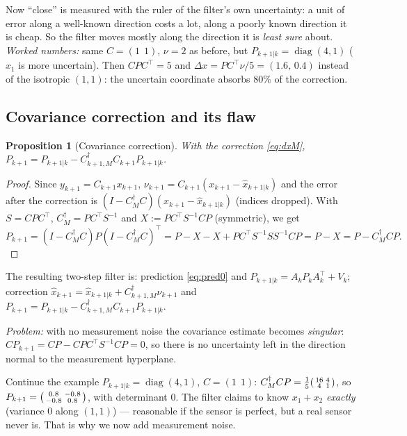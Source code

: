 \documentclass[11pt,a4paper]{article}
\def\boldsymbol#1{#1}%
\def\mathbf#1{#1}%
\DeclareMathOperator{\diag}{diag}
\newcommand{\tp}{^{\top}}
\newcommand{\pinv}{^{\dagger}}
\newcommand{\hx}{\hat{\boldsymbol{x}}}
\newcommand{\bx}{\boldsymbol{x}}
\newcommand{\by}{\boldsymbol{y}}
\newcommand{\bnu}{\boldsymbol{\nu}}
\newcommand{\mA}{\mathbf{A}}
\newcommand{\mC}{\mathbf{C}}
\newcommand{\mP}{\mathbf{P}}
\newcommand{\mS}{\mathbf{S}}
\newcommand{\mV}{\mathbf{V}}
\newcommand{\mI}{\mathbf{I}}
\theoremstyle{definition}
\theoremstyle{plain}
\newtheorem{proposition}[definition]{Proposition}
\theoremstyle{remark}
\begin{document}
\begin{intuition}
Now ``close'' is measured with the ruler of the filter's own uncertainty: a unit of error along a well-known direction
costs a lot, along a poorly known direction it is cheap. So the filter moves mostly along the direction it is
\emph{least sure} about. \emph{Worked numbers:} same $\mC=(1\ \ 1)$, $\nu=2$ as before, but $\mP_{k+1|k}=\diag(4,1)$ ($x_1$ is more uncertain).
Then $\mC\mP\mC\tp=5$ and $\Delta\bx=\mP\mC\tp\nu/5=(1.6,\,0.4)$ instead of the isotropic $(1,1)$: the uncertain coordinate absorbs
$80\%$ of the correction.
\end{intuition}

\subsection{Covariance correction and its flaw}

\begin{proposition}[Covariance correction]\label{prop:covcorr}
With the correction \eqref{eq:dxM}, $\mP_{k+1}=\mP_{k+1|k}-\mC_{k+1,M}\pinv\mC_{k+1}\mP_{k+1|k}$.
\end{proposition}
\begin{proof}
Since $\by_{k+1}=\mC_{k+1}\bx_{k+1}$, $\bnu_{k+1}=\mC_{k+1}(\bx_{k+1}-\hx_{k+1|k})$ and the error after the correction is
$(\mI-\mC_M\pinv\mC)(\bx_{k+1}-\hx_{k+1|k})$ (indices dropped). With $\mS=\mC\mP\mC\tp$, $\mC_M\pinv=\mP\mC\tp\mS^{-1}$ and
$\mathbf X:=\mP\mC\tp\mS^{-1}\mC\mP$ (symmetric), we get
$\mP_{k+1}=(\mI-\mC_M\pinv\mC)\mP(\mI-\mC_M\pinv\mC)\tp=\mP-\mathbf X-\mathbf X+\mP\mC\tp\mS^{-1}\mS\mS^{-1}\mC\mP=\mP-\mathbf X=\mP-\mC_M\pinv\mC\mP.$
\end{proof}

The resulting two-step filter is: prediction \eqref{eq:pred0} and $\mP_{k+1|k}=\mA_k\mP_k\mA_k\tp+\mV_k$; correction
$\hx_{k+1}=\hx_{k+1|k}+\mC_{k+1,M}\pinv\bnu_{k+1}$ and $\mP_{k+1}=\mP_{k+1|k}-\mC_{k+1,M}\pinv\mC_{k+1}\mP_{k+1|k}$.

\emph{Problem:} with no measurement noise the covariance estimate becomes \emph{singular}: $\mC\mP_{k+1}=\mC\mP-\mC\mP\mC\tp\mS^{-1}\mC\mP=\mathbf 0$,
so there is no uncertainty left in the direction normal to the measurement hyperplane.

\begin{intuition}
Continue the example $\mP_{k+1|k}=\diag(4,1)$, $\mC=(1\ \ 1)$: $\mC_M\pinv\mC\mP=\tfrac15\begin{psmallmatrix}16&4\\4&1\end{psmallmatrix}$, so
$\mP_{k+1}=\begin{psmallmatrix}0.8&-0.8\\-0.8&0.8\end{psmallmatrix}$, with determinant $0$. The filter claims to know $x_1+x_2$ \emph{exactly}
(variance $0$ along $(1,1)$) --- reasonable if the sensor is perfect, but a real sensor never is. That is why we now add measurement noise.
\end{intuition}
\end{document}
